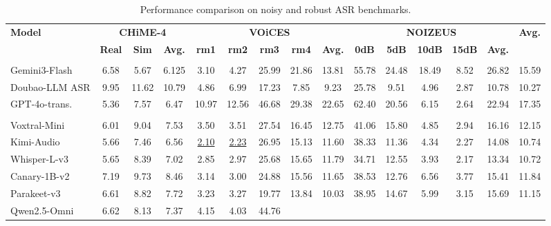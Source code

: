 \documentclass{article}
\begin{document}
\begin{table}[t]
\centering
\footnotesize
\renewcommand{\arraystretch}{1.0}

\caption{Performance comparison on noisy and robust ASR benchmarks.}
\vspace{-2mm}
\label{tab:main_noise}

\setlength{\tabcolsep}{2.73pt}
\begin{tabular}{lcccccccccccccc}
\toprule
\multirow{2}{*}{\textbf{Model}} &
\multicolumn{3}{c}{\textbf{CHiME-4}} &
\multicolumn{5}{c}{\textbf{VOiCES}} &
\multicolumn{5}{c}{\textbf{NOIZEUS}} &
\multirow{2}{*}{\textbf{Avg.}} \\
\cmidrule(lr){2-4}
\cmidrule(lr){5-9}
\cmidrule(lr){10-14}
&
\textbf{Real} &
\textbf{Sim} &
\textbf{Avg.} &
\textbf{rm1} &
\textbf{rm2} &
\textbf{rm3} &
\textbf{rm4} &
\textbf{Avg.} &
\textbf{0dB} &
\textbf{5dB} &
\textbf{10dB} &
\textbf{15dB} &
\textbf{Avg.} &
\\
\midrule
\rowcolor{headerblue}
\multicolumn{15}{l}{\textit{Closed-source models}} \\
Gemini3-Flash &
6.58 &
5.67 &
6.125 &
3.10 &
4.27 &
25.99 &
21.86 &
13.81 &
55.78 &
24.48 &
18.49 &
8.52 &
26.82 &
15.59 \\
Doubao-LLM ASR &
9.95 &
11.62 &
10.79 &
4.86 &
6.99 &
17.23 &
7.85 &
9.23 &
25.78 &
9.51 &
4.96 &
2.87 &
10.78 &
10.27 \\
GPT-4o-trans. &
5.36 &
7.57 &
6.47 &
10.97 &
12.56 &
46.68 &
29.38 &
22.65 &
62.40 &
20.56 &
6.15 &
2.64 &
22.94 &
17.35 \\
\rowcolor{headerblue}
\multicolumn{15}{l}{\textit{Open-source models}} \\
Voxtral-Mini &
6.01 &
9.04 &
7.53 &
3.50 &
3.51 &
27.54 &
16.45 &
12.75 &
41.06 &
15.80 &
4.85 &
2.94 &
16.16 &
12.15 \\
Kimi-Audio &
5.66 &
7.46 &
6.56 &
\underline{2.10} &
\underline{2.23} &
26.95 &
15.13 &
11.60 &
38.33 &
11.36 &
4.34 &
2.27 &
14.08 &
10.74 \\
Whisper-L-v3 &
5.65 &
8.39 &
7.02 &
2.85 &
2.97 &
25.68 &
15.65 &
11.79 &
34.71 &
12.55 &
3.93 &
2.17 &
13.34 &
10.72 \\
Canary-1B-v2 &
7.19 &
9.73 &
8.46 &
3.14 &
3.00 &
24.88 &
15.56 &
11.65 &
38.53 &
12.76 &
6.56 &
3.77 &
15.41 &
11.84 \\
Parakeet-v3 &
6.61 &
8.82 &
7.72 &
3.23 &
3.27 &
19.77 &
13.84 &
10.03 &
38.95 &
14.67 &
5.99 &
3.15 &
15.69 &
11.15 \\
Qwen2.5-Omni &
6.62 &
8.13 &
7.37 &
4.15 &
4.03 &
44.76 &

\end{tabular}
\end{table}
\end{document}
